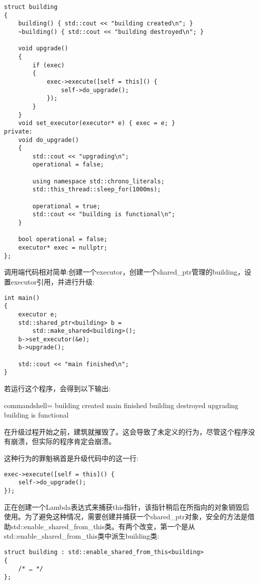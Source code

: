 \begin{lstlisting}[style=styleCXX]
struct building
{
	building() { std::cout << "building created\n"; }
	~building() { std::cout << "building destroyed\n"; }
	
	void upgrade()
	{
		if (exec)
		{
			exec->execute([self = this]() {
				self->do_upgrade();
			});
		}
	}
	void set_executor(executor* e) { exec = e; }
private:
	void do_upgrade()
	{
		std::cout << "upgrading\n";
		operational = false;
		
		using namespace std::chrono_literals;
		std::this_thread::sleep_for(1000ms);
		
		operational = true;
		std::cout << "building is functional\n";
	}

	bool operational = false;
	executor* exec = nullptr;
};
\end{lstlisting}

调用端代码相对简单:创建一个executor，创建一个shared\_ptr管理的building，设置executor引用，并进行升级:

\begin{lstlisting}[style=styleCXX]
int main()
{
	executor e;
	std::shared_ptr<building> b =
		std::make_shared<building>();
	b->set_executor(&e);
	b->upgrade();
	
	std::cout << "main finished\n";
}
\end{lstlisting}

若运行这个程序，会得到以下输出:

\begin{tcblisting}{commandshell={}}
building created
main finished
building destroyed
upgrading
building is functional
\end{tcblisting}

在升级过程开始之前，建筑就摧毁了。这会导致了未定义的行为，尽管这个程序没有崩溃，但实际的程序肯定会崩溃。

这种行为的罪魁祸首是升级代码中的这一行:

\begin{lstlisting}[style=styleCXX]
exec->execute([self = this]() {
	self->do_upgrade();
});
\end{lstlisting}

正在创建一个Lambda表达式来捕获this指针，该指针稍后在所指向的对象销毁后使用。为了避免这种情况，需要创建并捕获一个shared\_ptr对象，安全的方法是借助std::enable\_shared\_from\_this类。有两个改变，第一个是从std::enable\_shared\_from\_this类中派生building类:

\begin{lstlisting}[style=styleCXX]
struct building : std::enable_shared_from_this<building>
{
	/* … */
};
\end{lstlisting}

